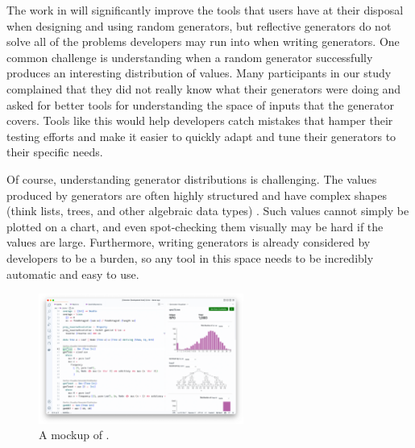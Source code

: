 The work in  will significantly improve the tools that
users have at their disposal when designing and using random generators, but
reflective generators do not solve all of the problems developers may run into
when writing generators. One common challenge is understanding when a random
generator successfully produces an interesting distribution of values. Many
participants in our study complained that they did not really know what their
generators were doing and asked for better tools for understanding the space of
inputs that the generator covers. Tools like this would help developers catch
mistakes that hamper their testing efforts and make it easier to quickly adapt
and tune their generators to their specific needs.

Of course, understanding generator distributions is challenging.  The values
produced by generators are often highly structured and have complex shapes
(think lists, trees, and other algebraic data types) .  Such values cannot simply
be plotted on a chart, and even spot-checking them visually may be hard if the
values are large.  Furthermore, writing generators is already considered by
developers to be a burden, so any tool in this space needs to be incredibly
automatic and easy to use.

\begin{figure}
  \centering
  \includegraphics[width=0.6\textwidth]{assets/gen-vis.png}
  \caption{A mockup of \genvis. }\label{fig:gen-vis}
\end{figure}

